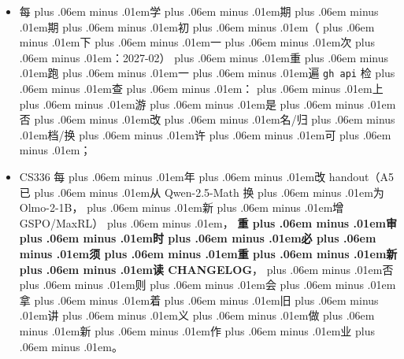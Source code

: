 \documentclass[
]{article}
\newcommand{\passthrough}[1]{#1}
\providecommand{\tightlist}{%
  \setlength{\itemsep}{0pt}\setlength{\parskip}{0pt}}
\def\zh#1{{\zhfont #1}}
\def\zhglue{\hskip0pt plus .06em minus .01em}
\begin{document}
\begin{itemize}
\tightlist
\item
  \zh{每\zhglue 学\zhglue 期\zhglue 期\zhglue 初\zhglue （\zhglue 下\zhglue 一\zhglue 次\zhglue ：}2027-02\zh{）\zhglue 重\zhglue 跑\zhglue 一\zhglue 遍} \passthrough{\lstinline!gh api!} \zh{检\zhglue 查\zhglue ：\zhglue 上\zhglue 游\zhglue 是\zhglue 否\zhglue 改\zhglue 名}/\zh{归\zhglue 档}/\zh{换\zhglue 许\zhglue 可\zhglue ；}
\item
  CS336 \zh{每\zhglue 年\zhglue 改} handout\zh{（}A5 \zh{已\zhglue 从} Qwen-2.5-Math \zh{换\zhglue 为} Olmo-2-1B\zh{，\zhglue 新\zhglue 增} GSPO/MaxRL\zh{）\zhglue ，} \textbf{\zh{重\zhglue 审\zhglue 时\zhglue 必\zhglue 须\zhglue 重\zhglue 新\zhglue 读} CHANGELOG}\zh{，\zhglue 否\zhglue 则\zhglue 会\zhglue 拿\zhglue 着\zhglue 旧\zhglue 讲\zhglue 义\zhglue 做\zhglue 新\zhglue 作\zhglue 业\zhglue 。}
\end{itemize}
\end{document}
